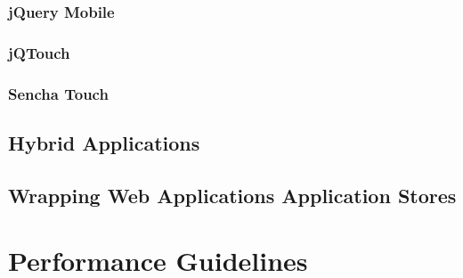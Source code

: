 \subsubsection{jQuery Mobile}
\subsubsection{jQTouch}
\subsubsection{Sencha Touch}

\subsection{Hybrid Applications}
\subsection{Wrapping Web Applications Application Stores}

\clearpage
\section{Performance Guidelines}
\label{section:performance-guidelines}


